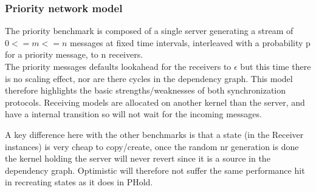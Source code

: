 \subsubsection{Priority network model}
The priority benchmark is composed of a single server generating a stream of $0<=m<=n$ messages at fixed time intervals, interleaved with a probability p for a priority message, to n receivers. \\ The priority messages defaults lookahead for the receivers to $\epsilon$ but this time there is no scaling effect, nor are there cycles in the dependency graph. This model therefore highlights the basic strengths/weaknesses of both synchronization protocols. Receiving models are allocated on another kernel than the server, and have a internal transition so will not wait for the incoming messages. 

A key difference here with the other benchmarks is that a state (in the Receiver instances) is very cheap to copy/create, once the random nr generation is done the kernel holding the server will never revert since it is a source in the dependency graph. Optimistic will therefore not suffer the same performance hit in recreating states as it does in PHold. 

